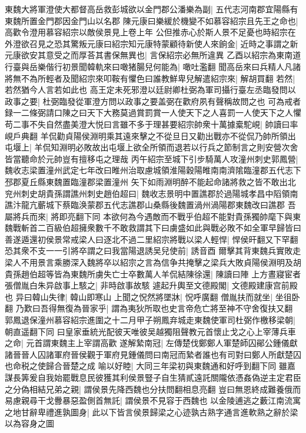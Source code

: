 東魏大將軍澄使大都督高岳救彭城欲以金門郡公潘樂為副|{
	五代志河南郡宜陽縣有東魏所置金門郡因金門山以名郡}
陳元康曰樂緩於機變不如慕容紹宗且先王之命也|{
	高歡令澄用慕容紹宗以敵侯景見上卷上年}
公但推赤心於斯人景不足憂也時紹宗在外澄欲召見之恐其驚叛元康曰紹宗知元康特蒙顧待新使人來餉金|{
	近時之事謂之新}
元康欲安其意受之而厚荅其書保無異也|{
	言保紹宗必無所違異}
乙酉以紹宗為東南道行臺與岳樂偕行初景聞韓軌來曰噉猪腸兒何能為|{
	噉吐濫翻}
聞高岳來曰兵精人凡諸將無不為所輕者及聞紹宗來叩鞍有懼色曰誰教鮮卑兒解遣紹宗來|{
	解胡買翻}
若然|{
	若然猶今人言若如此也}
高王定未死邪澄以廷尉卿杜弼為軍司攝行臺左丞臨發問以政事之要|{
	杜弼臨發從軍澄方問以政事之要盖弼在歡府夙有聲稱故問之也}
可為戒者録一二條弼請口陳之曰天下大務莫過賞罰賞一人使天下之人喜罰一人使天下之人懼苟二事不失自然盡美澄大悦曰言雖不多于理甚要紹宗帥衆十萬據槖駝峴|{
	帥讀曰率峴戶典翻}
羊侃勸貞陽侯淵明乘其遠來擊之不從旦日又勸出戰亦不從侃乃帥所領出屯堰上|{
	羊侃知淵明必敗故出屯堰上欲全所領而退若以行兵之節制言之則安營次舍皆當聽命於元帥豈有擅移屯之理哉}
丙午紹宗至城下引步騎萬人攻潼州刺史郭鳳營|{
	魏收志梁置潼州武定七年改曰睢州治取慮城領淮陽穀陽睢南南濟隂臨潼郡五代志下邳郡夏丘縣東魏置臨潼郡梁置潼州}
矢下如雨淵明醉不能起命諸將救之皆不敢出北兖州刺史胡貴孫謂譙州刺史趙伯超曰|{
	魏收志景明中置譙郡於過陽城孝昌中䧟領南譙汴龍亢蘄城下蔡臨涣蒙郡五代志譙郡山桑縣後魏置渦州渦陽郡東魏改曰譙郡}
吾屬將兵而來|{
	將即亮翻下同}
本欲何為今遇敵而不戰乎伯超不能對貴孫獨帥麾下與東魏戰斬首二百級伯超擁衆數千不敢救謂其下曰虜盛如此與戰必敗不如全軍早歸皆曰善遂遁還初侯景常戒梁人曰逐北不過二里紹宗將戰以梁人輕悍|{
	悍侯旰翻又下罕翻}
恐其衆不支一一引將卒謂之曰我當陽退誘吴兒使前|{
	誘音酉}
爾擊其背東魏兵實敗走梁人不用景言乘勝深入魏將卒以紹宗之言為信争共掩擊之梁兵大敗貞陽侯淵明及胡貴孫趙伯超等皆為東魏所虜失亡士卒數萬人羊侃結陳徐還|{
	陳讀曰陣}
上方晝寢宦者張僧胤白朱异啟事上駭之|{
	非時啟事故駭}
遽起升輿至文德殿閣|{
	文德殿建康宫前殿也}
异曰韓山失律|{
	韓山即寒山}
上聞之怳然將墜牀|{
	怳呼廣翻}
僧胤扶而就坐|{
	坐徂卧翻}
乃歎曰吾得無復為晉家乎|{
	謂為夷狄所取也史言帝危亡將至神不守舍復扶又翻}
郭鳳退保潼州慕容紹宗進圍之十二月甲子朔鳳弃城走東魏使軍司杜弼作檄移梁朝|{
	朝直遥翻下同}
曰皇家垂統光配彼天唯彼吴越獨阻聲教元首懷止戈之心上宰薄兵車之命|{
	元首謂東魏主上宰謂高歡}
遂解縶南冠|{
	左傳楚伐鄭鄭人軍楚師囚鄖公鍾儀獻諸晉晉人囚諸軍府晉侯觀于軍府見鍾儀問曰南冠而縶者誰也有司對曰鄭人所獻楚囚也命税之使歸合晉楚之成}
喻以好睦|{
	大同三年梁初與東魏通和好呼到翻下同}
雖嘉謀長筭爰自我始罷戰息民彼獲其利侯景豎子自生猜貳遠託關隴依憑姦偽逆主定君臣之分偽相結兄弟之親|{
	謂侯景先降西魏也分扶問翻相息亮翻}
豈曰無恩終成難養俄而易慮親尋干戈釁暴惡盈側首無託|{
	謂侯景不見容于西魏也}
以金陵逋逃之藪江南流寓之地甘辭卑禮進孰圖身|{
	此以下皆言侯景歸梁之心迹孰古熟字通言進軟熟之辭於梁以為容身之圖}
